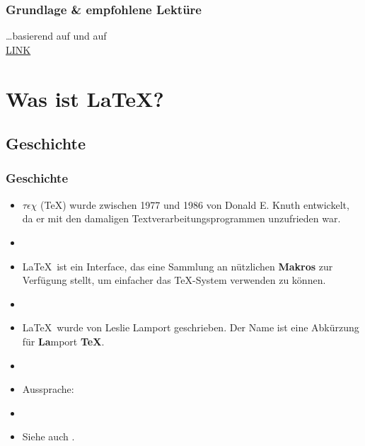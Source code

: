 \begin{frame}
\frametitle{Grundlage \& empfohlene Lektüre}

\dots basierend auf \citet{Freitag&MyP15a} und auf \citet{MyP&Kerkhof16a}\\
\ras \href{https://www.researchgate.net/publication/279514740_LATEX-Einfuhrung_fur_Linguisten}{LINK}

\end{frame}


\section{Was ist \LaTeX ?}

\subsection{Geschichte}

\begin{frame}
\frametitle{Geschichte}

\begin{itemize}
	\item $\tau \epsilon \chi$ (\TeX ) wurde zwischen 1977 und 1986 von Donald E. Knuth entwickelt, da er mit den damaligen Textverarbeitungsprogrammen unzufrieden war.
	
	\item[]
	
	\item \LaTeX\ ist ein Interface, das eine Sammlung an nützlichen \textbf{Makros} zur Verfügung stellt, um einfacher das \TeX -System verwenden zu können. 
	
	\item[]
	
	\item \LaTeX\ wurde von Leslie Lamport geschrieben. Der Name ist eine Abkürzung für \textbf{La}mport \textbf{TeX}. 
	
	\item[]
	
	\item Aussprache: \textipa{["la:.tE\c{c}]}
	
	\item[]
	
	\item Siehe auch \citet{Kopka94a}.

\end{itemize}

\end{frame}


